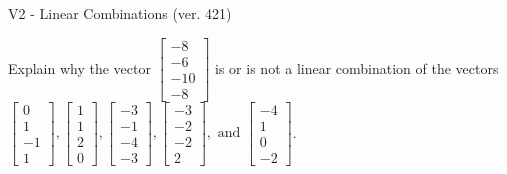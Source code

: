\begin{exercise}
  \begin{exerciseTitle}V2 - Linear Combinations (ver. 421)\end{exerciseTitle}
  \begin{exerciseStatement}
    Explain why the vector \(\left[\begin{array}{c}
-8 \\
-6 \\
-10 \\
-8
\end{array}\right]\)  is or is not a linear 
	combination of the vectors \(\left[\begin{array}{c}
0 \\
1 \\
-1 \\
1
\end{array}\right] , \left[\begin{array}{c}
1 \\
1 \\
2 \\
0
\end{array}\right] , \left[\begin{array}{c}
-3 \\
-1 \\
-4 \\
-3
\end{array}\right] , \left[\begin{array}{c}
-3 \\
-2 \\
-2 \\
2
\end{array}\right] , \text{ and } \left[\begin{array}{c}
-4 \\
1 \\
0 \\
-2
\end{array}\right]\).
	



\end{exerciseStatement}
\end{exercise}
